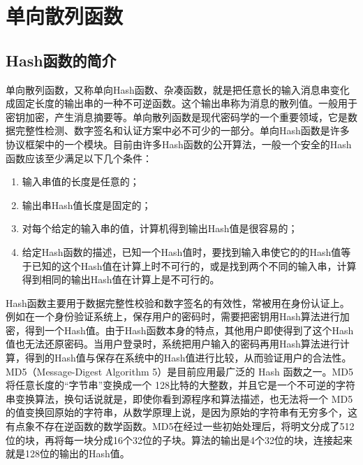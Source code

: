 \section{单向散列函数}
\subsection{Hash函数的简介}
单向散列函数，又称单向Hash函数、杂凑函数，就是把任意长的输入消息串变化成固定长度的输出串的一种不可逆函数。这个输出串称为消息的散列值。一般用于密钥加密，产生消息摘要等。单向散列函数是现代密码学的一个重要领域，它是数据完整性检测、数字签名和认证方案中必不可少的一部分。单向Hash函数\cite{hash}是许多协议框架中的一个模块。目前由许多Hash函数的公开算法，一般一个安全的Hash函数应该至少满足以下几个条件：
\begin{enumerate}
\item 输入串值的长度是任意的；
\item 输出串Hash值长度是固定的；
\item 对每个给定的输入串的值，计算机得到输出Hash值是很容易的；
\item 给定Hash函数的描述，已知一个Hash值时，要找到输入串使它的的Hash值等于已知的这个Hash值在计算上时不可行的，或是找到两个不同的输入串，计算得到相同的输出Hash值在计算上是不可行的。
\end{enumerate}
Hash函数主要用于数据完整性校验和数字签名的有效性，常被用在身份认证上。例如在一个身份验证系统上，保存用户的密码时，需要把密钥用Hash算法进行加密，得到一个Hash值。由于Hash函数本身的特点，其他用户即使得到了这个Hash值也无法还原密码。当用户登录时，系统把用户输入的密码再用Hash算法进行计算，得到的Hash值与保存在系统中的Hash值进行比较，从而验证用户的合法性。
MD5\cite{md5}（Message-Digest Algorithm 5）是目前应用最广泛的 Hash 函数之一。MD5 将任意长度的“字节串”变换成一个 128比特的大整数，并且它是一个不可逆的字符串变换算法，换句话说就是，即使你看到源程序和算法描述，也无法将一个 MD5 的值变换回原始的字符串，从数学原理上说，是因为原始的字符串有无穷多个，这有点象不存在逆函数的数学函数。MD5在经过一些初始处理后，将明文分成了512位的块，再将每一块分成16个32位的子块。算法的输出是4个32位的块，连接起来就是128位的输出的Hash值。
